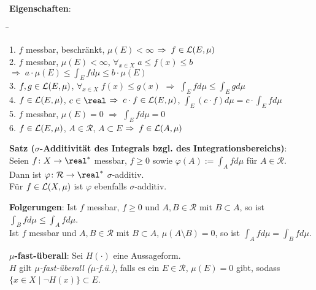 \textbf{Eigenschaften}:\vspace{-2mm}
\begin{tabbing}
    \hspace{9cm}\=\kill
    
    1. $f$ messbar, beschränkt, $\mu(E) < \infty$ \>
    $\Rightarrow\; f \in \mathcal{L}(E, \mu)$ \\[2mm]
    
    2. $f$ messbar, $\mu(E) < \infty$,
    $\forall_{x \in X}\; a \le f(x) \le b$ \>
    $\Rightarrow\; a \cdot \mu(E) \le \int_E f d\mu \le b \cdot \mu(E)$ \\[2mm]
    
    3. $f, g \in \mathcal{L}(E, \mu)$, $\forall_{x \in X}\; f(x) \le g(x)$ \>
    $\Rightarrow\; \int_E f d\mu \le \int_E g d\mu$ \\[2mm]
    
    4. $f \in \mathcal{L}(E, \mu)$, $c \in \real$ \>
    $\Rightarrow\; c \cdot f \in \mathcal{L}(E, \mu)$,
    $\int_E (c \cdot f) d\mu = c \cdot \int_E f d\mu$ \\[2mm]
    
    5. $f$ messbar, $\mu(E) = 0$ \>
    $\Rightarrow\; \int_E f d\mu = 0$ \\[2mm]
    
    6. $f \in \mathcal{L}(E, \mu)$, $A \in \mathcal{R}$, $A \subset E$ \>
    $\Rightarrow\; f \in \mathcal{L}(A, \mu)$
\end{tabbing}

\linie

\textbf{Satz ($\sigma$-Additivität des Integrals bzgl. des
Integrationsbereichs)}: \\
Seien $f\colon X \rightarrow \real^\ast$ messbar, $f \ge 0$
sowie $\varphi(A) := \int_A f d\mu$ für $A \in \mathcal{R}$. \\
Dann ist $\varphi\colon \mathcal{R} \rightarrow \real^\ast$
$\sigma$-additiv. \\
Für $f \in \mathcal{L}(X, \mu)$ ist $\varphi$ ebenfalls
$\sigma$-additiv.

\textbf{Folgerungen}:
Ist $f$ messbar, $f \ge 0$ und $A, B \in \mathcal{R}$ mit $B \subset A$,
so ist $\int_B f d\mu \le \int_A f d\mu$. \\
Ist $f$ messbar und $A, B \in \mathcal{R}$ mit $B \subset A$,
$\mu(A \setminus B) = 0$, so ist $\int_A f d\mu = \int_B f d\mu$.

\linie

\textbf{$\mu$-fast-überall}:
Sei $H(\cdot)$ eine Aussageform. \\
$H$ gilt \emph{$\mu$-fast-überall ($\mu$-f.ü.)},
falls es ein $E \in \mathcal{R}$, $\mu(E) = 0$
gibt, sodass $\{x \in X \;|\; \lnot H(x)\} \subset E$.

